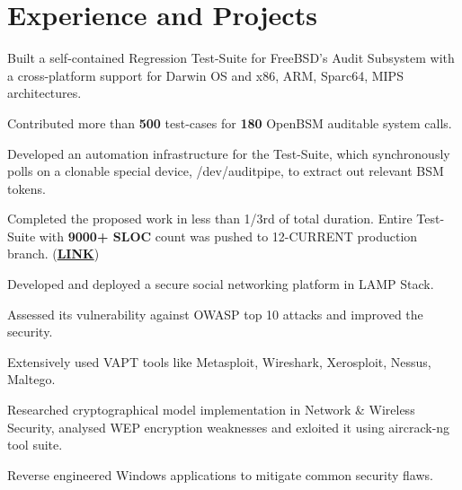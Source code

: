 \documentclass[]{deedy-resume-openfont}
\begin{document}
\begin{minipage}[t]{0.70\textwidth}

\vspace{-0.7cm}
\section{Experience and Projects}
\vspace{\topsep} %
\begin{tightemize}
\item Built a self-contained Regression Test-Suite for FreeBSD's Audit Subsystem with a cross-platform support for Darwin OS and x86, ARM, Sparc64, MIPS architectures.
  \item Contributed more than \textbf{500} test-cases for \textbf{180} OpenBSM auditable system calls.
  \item Developed an automation infrastructure for the Test-Suite, which synchronously polls on a clonable special device, /dev/auditpipe, to extract out relevant BSM tokens.
  \item	Completed the proposed work in less than 1/3rd of total duration. Entire Test-Suite with \textbf{9000+ SLOC} count was pushed to 12-CURRENT production branch. (\href{https://github.com/freebsd/freebsd/tree/master/tests/sys/audit}{\textbf{LINK}})
\end{tightemize}

\vspace{0.1cm}
\vspace{0cm} %
\begin{tightemize}
  \item Developed and deployed a secure social networking platform in LAMP Stack.
  \item Assessed its vulnerability against OWASP top 10 attacks and improved the security.
  \item Extensively used VAPT tools like Metasploit, Wireshark, Xerosploit, Nessus, Maltego.
  \item	Researched cryptographical model implementation in Network \& Wireless Security, analysed WEP encryption weaknesses and exloited it using aircrack-ng tool suite.
  \item Reverse engineered Windows applications to mitigate common security flaws.
\end{tightemize}


\end{minipage}
\end{document}
